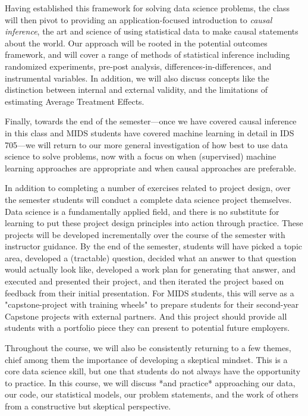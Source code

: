 \documentclass[12pt]{article}
\begin{document}
Having established this framework for solving data science problems, the class will then pivot to providing an application-focused introduction to \emph{causal inference}, the art and science of using statistical data to make causal statements about the world. Our approach will be rooted in the potential outcomes framework, and will cover a range of methods of statistical inference including randomized experiments, pre-post analysis, differences-in-differences, and instrumental variables. In addition, we will also discuss concepts like the distinction between internal and external validity, and the limitations of estimating Average Treatment Effects.

Finally, towards the end of the semester—once we have covered causal inference in this class and MIDS students have covered machine learning in detail in IDS 705—we will return to our more general investigation of how best to use data science to solve problems, now with a focus on when (supervised) machine learning approaches are appropriate and when causal approaches are preferable.

In addition to completing a number of exercises related to project design, over the semester students will conduct a complete data science project themselves. Data science is a fundamentally applied field, and there is no substitute for learning to put these project design principles into action through practice. These projects will be developed incrementally over the course of the semester with instructor guidance. By the end of the semester, students will have picked a topic area, developed a (tractable) question, decided what an answer to that question would actually look like, developed a work plan for generating that answer, and executed and presented their project, and then iterated the project based on feedback from their initial presentation. For MIDS students, this will serve as a "capstone-project with training wheels" to prepare students for their second-year Capstone projects with external partners. And this project should provide all students with a portfolio piece they can present to potential future employers. 

Throughout the course, we will also be consistently returning to a few themes, chief among them the importance of developing a skeptical mindset. This is a core data science skill, but one that students do not always have the opportunity to practice. In this course, we will discuss *and practice* approaching our data, our code, our statistical models, our problem statements, and the work of others from a constructive but skeptical perspective.
\end{document}
